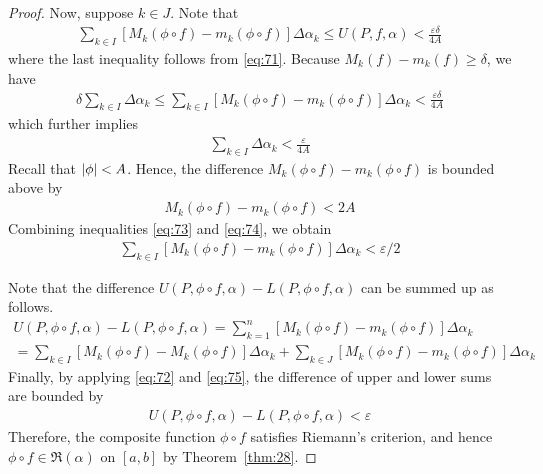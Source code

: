 \documentclass[thmcnt=section, 12pt]{my-elegantbook}
\begin{document}
\begin{proof}
    Now, suppose $k \in J$. Note that 
    \begin{align*}
        \sum_{k \in I} \left[ M_k(\phi \circ f) - m_k(\phi \circ f) \right] \Delta \alpha_k
        \leq U(P,f,\alpha)
        < \frac{\varepsilon \delta}{4 A}
    \end{align*}
    where the last inequality follows from \eqref{eq:71}. Because $M_k(f) - m_k(f) \geq \delta$, we have 
    \begin{align*}
        \delta \sum_{k \in I} \Delta \alpha_k
        \leq \sum_{k \in I} \left[ M_k(\phi \circ f) - m_k(\phi \circ f) \right] \Delta \alpha_k
        < \frac{\varepsilon \delta}{4 A}
    \end{align*}
    which further implies
    \begin{align}
        \sum_{k \in I} \Delta \alpha_k
        < \frac{\varepsilon}{4 A}
        \label{eq:73}
    \end{align}
    Recall that $\left\lvert \phi \right\rvert < A$. Hence, the difference $M_k(\phi \circ f) - m_k(\phi \circ f)$ is bounded above by 
    \begin{align}
        M_k(\phi \circ f) - m_k(\phi \circ f)
        < 2A
        \label{eq:74}
    \end{align}
    Combining inequalities \eqref{eq:73} and \eqref{eq:74}, we obtain 
    \begin{align}
        \sum_{k \in I} \left[ M_k(\phi \circ f) - m_k(\phi \circ f) \right] \Delta \alpha_k
        < \varepsilon / 2
        \label{eq:75}
    \end{align}

    Note that the difference $U(P,\phi \circ f, \alpha) - L(P,\phi \circ f, \alpha)$ can be summed up as follows.
    \begin{multline*}
        U(P,\phi \circ f, \alpha) - L(P,\phi \circ f, \alpha)
        = \sum_{k=1}^n \left[ M_k(\phi \circ f) - m_k(\phi \circ f) \right] \Delta \alpha_k \\ 
        = \sum_{k \in I} \left[ M_k(\phi \circ f) - M_k(\phi \circ f) \right] \Delta \alpha_k
        + \sum_{k \in J} \left[ M_k(\phi \circ f) - m_k(\phi \circ f) \right] \Delta \alpha_k
    \end{multline*}
    Finally, by applying \eqref{eq:72} and \eqref{eq:75}, the difference of upper and lower sums are bounded by 
    \begin{align*}
        U(P,\phi \circ f, \alpha) - L(P,\phi \circ f, \alpha) < \varepsilon
    \end{align*}
    Therefore, the composite function $\phi \circ f$ satisfies Riemann's criterion, and hence $\phi \circ f \in \mathfrak{R}(\alpha)$ on $[a, b]$ by Theorem~\ref{thm:28}.
\end{proof}
\end{document}
